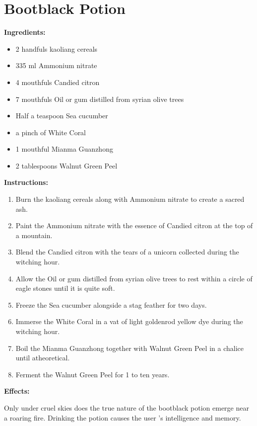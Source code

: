 \documentclass{article}
\begin{document}
\newpage
\section*{Bootblack Potion}

\textbf{Ingredients:}

\begin{itemize}
  \item 2 handfuls kaoliang cereals
  \item 335 ml Ammonium nitrate
  \item 4 mouthfuls Candied citron
  \item 7 mouthfuls Oil or gum distilled from syrian olive trees
  \item Half a teaspoon Sea cucumber
  \item a pinch of White Coral
  \item 1 mouthful Mianma Guanzhong
  \item 2 tablespoons Walnut Green Peel
\end{itemize}

\textbf{Instructions:}

\begin{enumerate}
  \item Burn the kaoliang cereals along with Ammonium nitrate to create a sacred ash.
  \item Paint the Ammonium nitrate with the essence of Candied citron at the top of a mountain.
  \item Blend the Candied citron with the tears of a unicorn collected during the witching hour.
  \item Allow the Oil or gum distilled from syrian olive trees to rest within a circle of eagle stones until it is quite soft.
  \item Freeze the Sea cucumber alongside a stag feather for two days.
  \item Immerse the White Coral in a vat of light goldenrod yellow dye during the witching hour.
  \item Boil the Mianma Guanzhong together with Walnut Green Peel in a chalice until atheoretical.
  \item Ferment the Walnut Green Peel for 1 to ten years.
\end{enumerate}

\textbf{Effects:}

Only under cruel skies does the true nature of the bootblack potion emerge near a roaring fire. Drinking the potion causes the user 's intelligence and memory.
\end{document}
